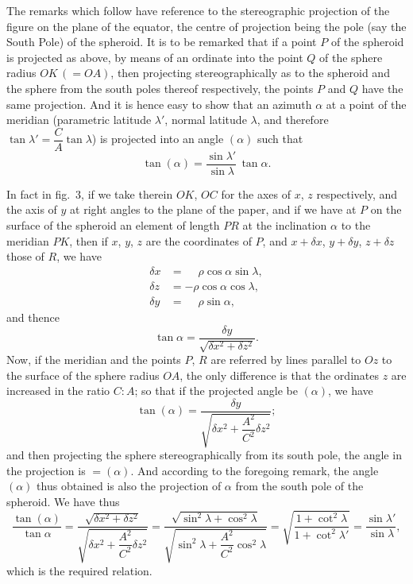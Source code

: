 \documentclass[11pt,a4paper]{article}
\begin{document}
\medskip

The remarks which follow have reference to the stereographic projection of the
figure on the plane of the equator, the centre of projection being the pole
(say the South Pole) of the spheroid.  It is to be remarked that if a point
$P$ of the spheroid is projected as above, by means of an ordinate into the
point $Q$ of the sphere radius $OK\,(= OA)$, then projecting stereographically
as to the spheroid and the sphere from the south poles thereof respectively,
the points $P$ and $Q$ have the same projection.  And it is hence easy to show
that an azimuth $\alpha$ at a point of the meridian (parametric latitude
$\lambda'$, normal latitude $\lambda$, and therefore
$\tan\lambda' = \dfrac{C}{A}\tan\lambda$) is projected into an angle $(\alpha)$
such that
\[
\tan(\alpha) = \frac{\sin\lambda'}{\sin\lambda}\,\tan\alpha.
\]

In fact in fig.~3, if we take therein $OK$, $OC$ for the axes of $x$, $z$
respectively, and the axis of $y$ at right angles to the plane of the paper,
and if we have at $P$ on the surface of the spheroid an element of length $PR$
at the inclination $\alpha$ to the meridian $PK$, then if $x$, $y$, $z$ are
the coordinates of $P$, and $x + \delta x$, $y + \delta y$, $z + \delta z$
those of $R$, we have
\begin{align*}
\delta x &= \phantom{-}\rho\cos\alpha\sin\lambda, \\
\delta z &= -\rho\cos\alpha\cos\lambda, \\
\delta y &= \phantom{-}\rho\sin\alpha,
\end{align*}
and thence
\[
\tan\alpha = \frac{\delta y}{\sqrt{\delta x^2 + \delta z^2}}.
\]
Now, if the meridian and the points $P$, $R$ are referred by lines parallel to
$Oz$ to the surface of the sphere radius $OA$, the only difference is that the
ordinates $z$ are increased in the ratio $C : A$; so that if the projected
angle be $(\alpha)$, we have
\[
\tan(\alpha) = \frac{\delta y}
{\sqrt{\delta x^2 + \dfrac{A^2}{C^2}\delta z^2}};
\]
and then projecting the sphere stereographically from its south pole, the
angle in the projection is $= (\alpha)$.  And according to the foregoing
remark, the angle $(\alpha)$ thus obtained is also the projection of $\alpha$
from the south pole of the spheroid.  We have thus
\[
\frac{\tan(\alpha)}{\tan\alpha}
= \frac{\sqrt{\delta x^2 + \delta z^2}}
       {\sqrt{\delta x^2 + \dfrac{A^2}{C^2}\delta z^2}}
= \frac{\sqrt{\sin^2\lambda + \cos^2\lambda}}
       {\sqrt{\sin^2\lambda + \dfrac{A^2}{C^2}\cos^2\lambda}}
= \sqrt{\frac{1 + \cot^2\lambda}{1 + \cot^2\lambda'}}
= \frac{\sin\lambda'}{\sin\lambda},
\]
which is the required relation.
\end{document}
